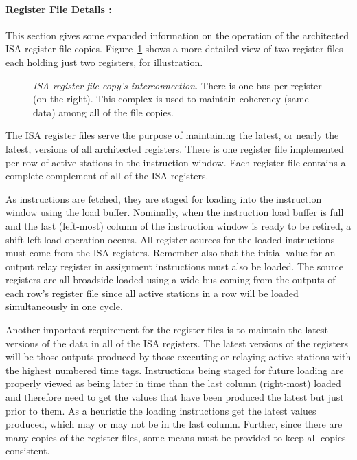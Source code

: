 \documentclass[10pt,dvips]{article}
\begin{document}
\paragraph{Register File Details : }
This section gives some expanded information on the operation
of the architected ISA register file copies.
Figure~\ref{registers2} shows a more detailed view
of two register files each holding just two registers, for
illustration.

\begin{figure}
\centering
{}
\caption{{\em ISA register file copy's interconnection.}
There is one bus per register (on the right). This complex
is used to maintain coherency (same data) among all
of the file copies.
}
\label{registers2}
\end{figure}

The ISA register files serve the purpose
of maintaining the latest, or nearly the latest, versions of
all architected registers.  There is one register file
implemented per row of active stations in the instruction window.
Each register file contains a complete complement of all of
the ISA registers.

As instructions are fetched, they are staged for loading into the
instruction window using the load buffer.  Nominally, when the
instruction load buffer is full and the last (left-most) column of the
instruction window is ready to be retired, a shift-left load
operation occurs.  All register sources for the loaded instructions
must come from the ISA registers.  Remember also that the initial
value for an output relay register in assignment instructions
must also be loaded. The source registers are all broadside loaded
using a wide bus coming from the outputs of each row's register 
file since all active stations in a row
will be loaded simultaneously in one cycle.

Another important requirement for the register files is to
maintain the latest versions of the data in all of the ISA registers.
The latest versions of the registers will be those outputs
produced by those executing or relaying
active stations with the highest numbered
time tags.  Instructions being staged for future loading
are properly viewed as being later in time than the last
column (right-most) loaded and therefore need to get the
values that have been produced the latest but just prior to them.
As a heuristic the loading instructions get the latest values
produced, which may or may not be in the last column.
Further, since there are many copies of the register
files, some means must be provided to keep all copies
consistent.
\end{document}
